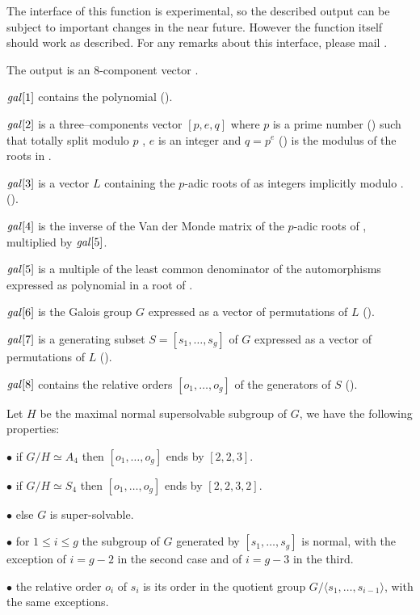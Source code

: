  The interface of this function is experimental,
so the described output can be subject to important changes in the
near future. However the function itself should work as described. For any
remarks about this interface, please mail .

The output is an 8-component vector .

 $\hbox{\it gal\/}[1]$ contains the polynomial 
 ().

 $\hbox{\it gal\/}[2]$ is a three--components vector $[p,e,q]$ where $p$ is a
 prime number () such that  totally split
 modulo $p$ , $e$ is an integer and $q=p^e$ () is the
 modulus of the roots in .

 $\hbox{\it gal\/}[3]$ is a vector $L$ containing the $p$-adic roots of
  as integers implicitly modulo .
 ().

 $\hbox{\it gal\/}[4]$ is the inverse of the Van der Monde matrix of the
 $p$-adic roots of , multiplied by $\hbox{\it gal\/}[5]$.

 $\hbox{\it gal\/}[5]$ is a multiple of the least common denominator of the
 automorphisms expressed as polynomial in a root of .

 $\hbox{\it gal\/}[6]$ is the Galois group $G$ expressed as a vector of
 permutations of $L$ ().

 $\hbox{\it gal\/}[7]$ is a generating subset $S=[s_1,\ldots,s_g]$ of $G$
 expressed as a vector of permutations of $L$ ().

 $\hbox{\it gal\/}[8]$ contains the relative orders $[o_1,\ldots,o_g]$ of
 the generators of $S$ ().

Let $H$ be the maximal normal supersolvable subgroup of $G$, we have the
following properties:

\quad$\bullet$ if $G/H\simeq A_4$ then $[o_1,\ldots,o_g]$ ends by
$[2,2,3]$.

\quad$\bullet$ if $G/H\simeq S_4$ then $[o_1,\ldots,o_g]$ ends by
$[2,2,3,2]$.

\quad$\bullet$ else $G$ is super-solvable.

\quad$\bullet$ for $1\leq i \leq g$ the subgroup of $G$ generated by
$[s_1,\ldots,s_g]$ is normal, with the exception of $i=g-2$ in the
second case and of $i=g-3$ in the third.

\quad$\bullet$ the relative order $o_i$ of $s_i$ is its order in the
quotient group $G/\langle s_1,\ldots,s_{i-1}\rangle$, with the same
exceptions.


